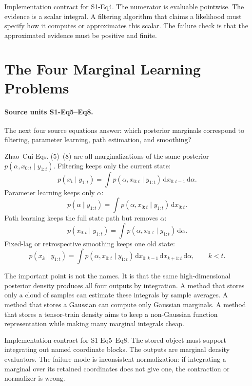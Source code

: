 \documentclass[11pt]{article}
\newcommand{\dd}{\,\mathrm d}
\begin{document}
Implementation contract for S1-Eq4.  The numerator is evaluable pointwise.  The
evidence is a scalar integral.  A filtering algorithm that claims a likelihood
must specify how it computes or approximates this scalar.  The failure check is
that the approximated evidence must be positive and finite.

\section{The Four Marginal Learning Problems}

\paragraph{Source units S1-Eq5--Eq8.}
The next four source equations answer: which posterior marginals correspond to
filtering, parameter learning, path estimation, and smoothing?

Zhao--Cui Eqs. (5)--(8) are all marginalizations of the same posterior
\(p(\alpha,x_{0:t}\mid y_{1:t})\).  Filtering keeps only the current state:
\[
    p(x_t\mid y_{1:t})
    =
    \int p(\alpha,x_{0:t}\mid y_{1:t})
    \dd x_{0:t-1}\dd\alpha .
    \tag{BF-5}
\]
Parameter learning keeps only \(\alpha\):
\[
    p(\alpha\mid y_{1:t})
    =
    \int p(\alpha,x_{0:t}\mid y_{1:t})\dd x_{0:t}.
    \tag{BF-6}
\]
Path learning keeps the full state path but removes \(\alpha\):
\[
    p(x_{0:t}\mid y_{1:t})
    =
    \int p(\alpha,x_{0:t}\mid y_{1:t})\dd\alpha .
    \tag{BF-7}
\]
Fixed-lag or retrospective smoothing keeps one old state:
\[
    p(x_k\mid y_{1:t})
    =
    \int p(\alpha,x_{0:t}\mid y_{1:t})
    \dd x_{0:k-1}\dd x_{k+1:t}\dd\alpha ,
    \qquad k<t .
    \tag{BF-8}
\]

The important point is not the names.  It is that the same high-dimensional
posterior density produces all four outputs by integration.  A method that
stores only a cloud of samples can estimate these integrals by sample averages.
A method that stores a Gaussian can compute only Gaussian marginals.  A method
that stores a tensor-train density aims to keep a non-Gaussian function
representation while making many marginal integrals cheap.

Implementation contract for S1-Eq5--Eq8.  The stored object must support
integrating out named coordinate blocks.  The outputs are marginal density
evaluators.  The failure mode is inconsistent normalization: if integrating a
marginal over its retained coordinates does not give one, the contraction or
normalizer is wrong.
\end{document}
